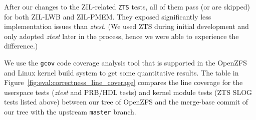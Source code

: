 \documentclass[12pt,a4paper,twoside]{book}
\begin{document}
After our changes to the ZIL-related \lstinline{ZTS} tests, all of them pass (or are skipped) for both ZIL-LWB and ZIL-PMEM.
They exposed significantly less implementation issues than \textit{ztest}.
(We used ZTS during initial development and only adopted \textit{ztest} later in the process, hence we were able to experience the difference.)

We use the \lstinline{gcov} code coverage analysis tool that is supported in the OpenZFS and Linux kernel build system to get some quantitative results.
The table in Figure~\ref{fig:eval:correctness_line_coverage} compares the line coverage for the userspace tests (\textit{ztest} and PRB/HDL tests) and kernel module tests (ZTS SLOG tests listed above) between our tree of OpenZFS and the merge-base commit of our tree with the upstream \lstinline{master} branch.

\newcommand{\cssubheader}[1]{\multicolumn{1}{c}{ \rotatebox[origin=c]{90}{#1} } }
\end{document}
